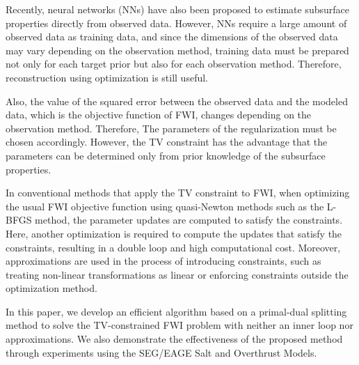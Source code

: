 Recently, neural networks (NNs) have also been proposed to estimate subsurface properties directly from observed data\cite{ML-FWI0,ML-FWI1,ML-FWI2,ML-FWI3}.
However, NNs require a large amount of observed data as training data, and since the dimensions of the observed data may vary depending on the observation method, training data must be prepared not only for each target prior but also for each observation method.
Therefore, reconstruction using optimization is still useful.

Also, the value of the squared error between the observed data and the modeled data, which is the objective function of FWI, changes depending on the observation method.
Therefore, The parameters of the regularization must be chosen accordingly.
However, the TV constraint has the advantage that the parameters can be determined only from prior knowledge of the subsurface properties\cite{constraints-vs-penalties-in-FWI}.

In conventional methods that apply the TV constraint to FWI\cite{FWI-with-TV-constraint,FWI-with-TV-constraint2}, when optimizing the usual FWI objective function using quasi-Newton methods such as the L-BFGS method, the parameter updates are computed to satisfy the constraints.
Here, another optimization is required to compute the updates that satisfy the constraints, resulting in a double loop and high computational cost.
Moreover, approximations are used in the process of introducing constraints, such as treating non-linear transformations as linear or enforcing constraints outside the optimization method.

In this paper, we develop an efficient algorithm based on a primal-dual splitting method to solve the TV-constrained FWI problem with neither an inner loop nor approximations.
We also demonstrate the effectiveness of the proposed method through experiments using the SEG/EAGE Salt and Overthrust Models.







